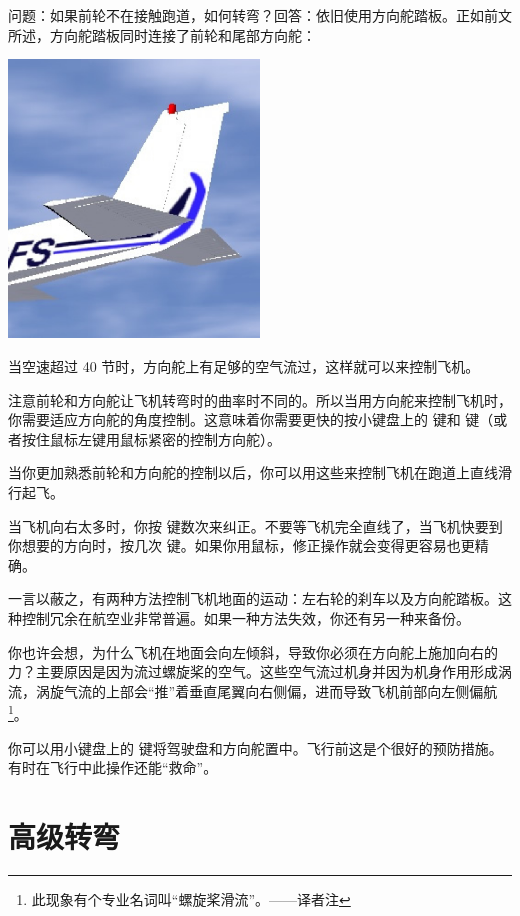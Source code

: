 问题：如果前轮不在接触跑道，如何转弯？回答：依旧使用方向舵踏板。正如前文所述，方向舵踏板同时连接了前轮和尾部方向舵：

\begin{center}
\includegraphics[width=0.5\textwidth]{img/tut_26}
\end{center}

当空速超过 40 节时，方向舵上有足够的空气流过，这样就可以来控制飞机。

注意前轮和方向舵让飞机转弯时的曲率时不同的。所以当用方向舵来控制飞机时，你需要适应方向舵的角度控制。这意味着你需要更快的按小键盘上的  键和  键（或者按住鼠标左键用鼠标紧密的控制方向舵）。

当你更加熟悉前轮和方向舵的控制以后，你可以用这些来控制飞机在跑道上直线滑行起飞。

当飞机向右太多时，你按  键数次来纠正。不要等飞机完全直线了，当飞机快要到你想要的方向时，按几次  键。如果你用鼠标，修正操作就会变得更容易也更精确。

一言以蔽之，有两种方法控制飞机地面的运动：左右轮的刹车以及方向舵踏板。这种控制冗余在航空业非常普遍。如果一种方法失效，你还有另一种来备份。

你也许会想，为什么飞机在地面会向左倾斜，导致你必须在方向舵上施加向右的力？主要原因是因为流过螺旋桨的空气。这些空气流过机身并因为机身作用形成涡流，涡旋气流的上部会“推”着垂直尾翼向右侧偏，进而导致飞机前部向左侧偏航\footnote{此现象有个专业名词叫“螺旋桨滑流”。——译者注}。

你可以用小键盘上的  键将驾驶盘和方向舵置中。飞行前这是个很好的预防措施。有时在飞行中此操作还能“救命”。

\section{高级转弯}
\label{sec:Turning}

